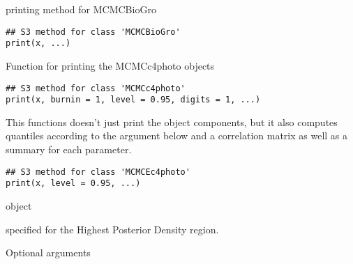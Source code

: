\documentclass[letterpaper]{book}
\begin{document}
%
\begin{Arguments}
\begin{ldescription}
\item[\code{x}] 
\end{ldescription}
\end{Arguments}
%
\begin{Description}\relax
printing method for MCMCBioGro
\end{Description}
%
\begin{Usage}
\begin{verbatim}
## S3 method for class 'MCMCBioGro'
print(x, ...)
\end{verbatim}
\end{Usage}
%
\begin{Arguments}
\begin{ldescription}
\item[\code{x}] 
\end{ldescription}
\end{Arguments}
%
\begin{Description}\relax
Function for printing the MCMCc4photo objects
\end{Description}
%
\begin{Usage}
\begin{verbatim}
## S3 method for class 'MCMCc4photo'
print(x, burnin = 1, level = 0.95, digits = 1, ...)
\end{verbatim}
\end{Usage}
%
\begin{Description}\relax
This functions doesn't just print the object components,
but it also computes quantiles according to the
 argument below and a correlation matrix as
well as a summary for each parameter.
\end{Description}
%
\begin{Usage}
\begin{verbatim}
## S3 method for class 'MCMCEc4photo'
print(x, level = 0.95, ...)
\end{verbatim}
\end{Usage}
%
\begin{Arguments}
\begin{ldescription}
\item[\code{x}]  object

\item[\code{level}] specified  for the Highest
Posterior Density region.

\item[\code{...}] Optional arguments
\end{ldescription}
\end{Arguments}
\end{document}
